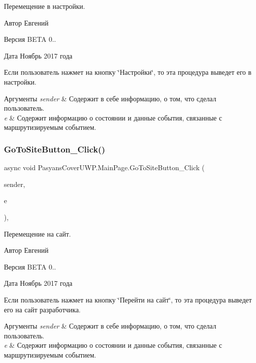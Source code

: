 Перемещение в настройки. 

\begin{DoxyAuthor}{Автор}
Евгений 
\end{DoxyAuthor}
\begin{DoxyVersion}{Версия}
B\+E\+TA 0.. 
\end{DoxyVersion}
\begin{DoxyDate}{Дата}
Ноябрь 2017 года
\end{DoxyDate}
Если пользователь нажмет на кнопку \char`\"{}Настройки\char`\"{}, то эта процедура выведет его в настройки. 
\begin{DoxyParams}{Аргументы}
{\em sender} & Содержит в себе информацию, о том, что сделал пользователь. \\
\hline
{\em e} & Содержит информацию о состоянии и данные события, связанные с маршрутизируемым событием. \\
\hline
\end{DoxyParams}
\mbox{\label{class_pasyans_cover_u_w_p_1_1_main_page_aa6e325227fad15da473a90c6b7137cfe}} 
\subsubsection{\texorpdfstring{Go\+To\+Site\+Button\+\_\+\+Click()}{GoToSiteButton\_Click()}}
{\footnotesize\ttfamily async void Pasyans\+Cover\+U\+W\+P.\+Main\+Page.\+Go\+To\+Site\+Button\+\_\+\+Click (\begin{DoxyParamCaption}\item[{object}]{sender,  }\item[{Routed\+Event\+Args}]{e }\end{DoxyParamCaption})\hspace{0.3cm}{\ttfamily [inline]}, {\ttfamily [private]}}



Перемещение на сайт. 

\begin{DoxyAuthor}{Автор}
Евгений 
\end{DoxyAuthor}
\begin{DoxyVersion}{Версия}
B\+E\+TA 0.. 
\end{DoxyVersion}
\begin{DoxyDate}{Дата}
Ноябрь 2017 года
\end{DoxyDate}
Если пользователь нажмет на кнопку \char`\"{}Перейти на сайт\char`\"{}, то эта процедура выведет его на сайт разработчика. 
\begin{DoxyParams}{Аргументы}
{\em sender} & Содержит в себе информацию, о том, что сделал пользователь. \\
\hline
{\em e} & Содержит информацию о состоянии и данные события, связанные с маршрутизируемым событием. \\
\hline
\end{DoxyParams}


